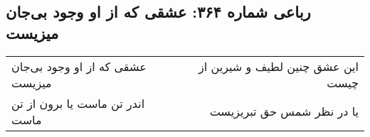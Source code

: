 \begin{center}
\section*{رباعی شماره ۳۶۴: عشقی که از او وجود بی‌جان میزیست}
\label{sec:0364}
\begin{longtable}{l p{0.5cm} r}
عشقی که از او وجود بی‌جان میزیست
&&
این عشق چنین لطیف و شیرین از چیست
\\
اندر تن ماست یا برون از تن ماست
&&
یا در نظر شمس حق تبریزیست
\\
\end{longtable}
\end{center}
